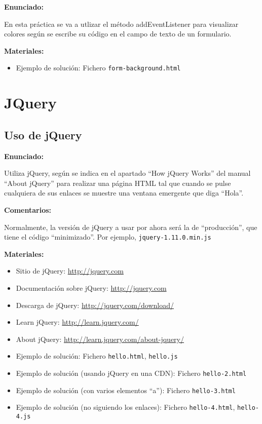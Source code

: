 \textbf{Enunciado:}

En esta práctica se va a utlizar el método addEventListener para visualizar colores según se escribe su código en el campo de texto de un formulario.

\textbf{Materiales:}

\begin{itemize}
\item Ejemplo de solución: Fichero \verb|form-background.html|
\end{itemize}


\section{JQuery}

\subsection{Uso de jQuery}
\label{subsec:eje-jquery-uso}

\textbf{Enunciado:}

Utiliza jQuery, según se indica en el apartado ``How jQuery Works'' del manual ``About jQuery'' para realizar una página HTML tal que cuando se pulse cualquiera de sus enlaces se muestre una ventana emergente que diga ``Hola''. 

\textbf{Comentarios:}

Normalmente, la versión de jQuery a usar por ahora será la de ``producción'', que tiene el código ``minimizado''. Por ejemplo, \verb|jquery-1.11.0.min.js|

\textbf{Materiales:}

\begin{itemize}
\item Sitio de jQuery: \url{http://jquery.com}
\item Documentación sobre jQuery: \url{http://jquery.com}
\item Descarga de jQuery: \url{http://jquery.com/download/}
\item Learn jQuery: \url{http://learn.jquery.com/}
\item About jQuery: \url{http://learn.jquery.com/about-jquery/}
\item Ejemplo de solución: Fichero \verb|hello.html|, \verb|hello.js|
\item Ejemplo de solución (usando jQuery en una CDN):
  Fichero \verb|hello-2.html|
\item Ejemplo de solución (con varios elementos ``a''):
  Fichero \verb|hello-3.html|
\item Ejemplo de solución (no siguiendo los enlaces):
  Fichero \verb|hello-4.html|, \verb|hello-4.js|
\end{itemize}


